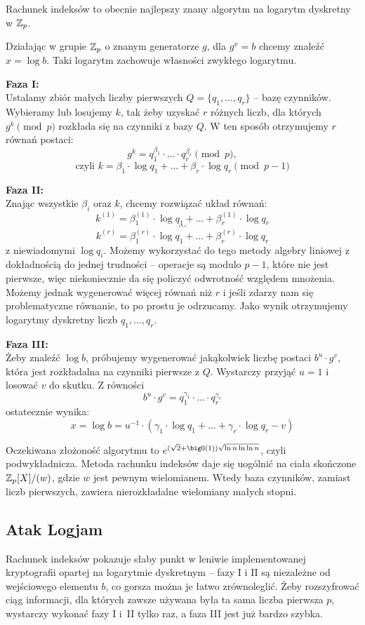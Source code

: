 Rachunek indeksów to obecnie najlepszy znany algorytm na logarytm dyskretny w \( \mathbb{Z}_p \).

Działając w grupie \( \mathbb{Z}_p \) o znanym generatorze \( g \), dla \( g^x = b \) chcemy znaleźć \( x = \log b \). Taki logarytm zachowuje własności zwykłego logarytmu.

\textbf{Faza I:} \\
Ustalamy zbiór małych liczby pierwszych \( Q = \{q_1, \dots, q_r\} \) -- bazę czynników.
Wybieramy lub losujemy \( k \), tak żeby uzyskać \( r \) różnych liczb, dla których \( g^k \pmod{p} \) rozkłada się na czynniki z bazy \( Q \). W ten sposób otrzymujemy \( r \) równań postaci:
\[
	g^k = q_1^{\beta_1} \cdot \ldots \cdot q_r^{\beta_r} \pmod{p},
\]
\[
	\text{czyli } k = \beta_1 \cdot \log q_1 + \ldots + \beta_r \cdot \log q_r \pmod{p - 1}
\]

\textbf{Faza II:} \\
Znając wszystkie \( \beta_i \) oraz \( k \), chcemy rozwiązać układ równań:
\[
	k^{(1)} = \beta_1^{(1)} \cdot \log q_1 + \ldots + \beta_r^{(1)} \cdot \log q_r
\]
\[
	\cdots
\]
\[
	k^{(r)} = \beta_1^{(r)} \cdot \log q_1 + \ldots + \beta_r^{(r)} \cdot \log q_r
\]
z niewiadomymi \( \log q_i \). Możemy wykorzystać do tego metody algebry liniowej z dokładnością do jednej trudności -- operacje są modulo \( p-1 \), które nie jest pierwsze, więc niekoniecznie da się policzyć odwrotność względem mnożenia. Możemy jednak wygenerować więcej równań niż \(r\) i jeśli zdarzy nam się problematyczne równanie, to po prostu je odrzucamy.
Jako wynik otrzymujemy logarytmy dyskretny liczb \( q_1, \dots, q_r \).

\textbf{Faza III:} \\
Żeby znaleźć \( \log b \), próbujemy wygenerować jakąkolwiek liczbę postaci \( b^u \cdot g^v \), która jest rozkładalna na czynniki pierwsze z \(Q\). Wystarczy przyjąć \( u = 1 \) i losować \( v \) do skutku. Z równości
\[ b^u \cdot g^v = q_1^{\gamma_1} \cdot \ldots \cdot q_r^{\gamma_r} \]
ostatecznie wynika:
\[ x = \log b = u^{-1} \cdot (\gamma_1 \cdot \log q_1 + \ldots + \gamma_r \cdot \log q_r - v) \]

Oczekiwana złożoność algorytmu to \( e^{(\sqrt{2}+\bigO(1))\sqrt{\ln n \ln\ln n}} \), czyli podwykładnicza. Metoda rachunku indeksów daje się uogólnić na ciała skończone \( \mathbb{Z}_p[X]/(w) \), gdzie \( w \) jest pewnym wielomianem. Wtedy baza czynników, zamiast liczb pierwszych, zawiera nierozkładalne wielomiany małych stopni.

\subsection{Atak Logjam}
Rachunek indeksów pokazuje słaby punkt w leniwie implementowanej kryptografii opartej na logarytmie dyskretnym -- fazy I i II są niezależne od wejściowego elementu \( b \), co gorsza można je łatwo zrównoleglić. Żeby rozszyfrować ciąg informacji, dla których zawsze używana była ta sama liczba pierwsza \( p \), wystarczy wykonać fazy I i~II tylko raz, a faza III jest już bardzo szybka.
